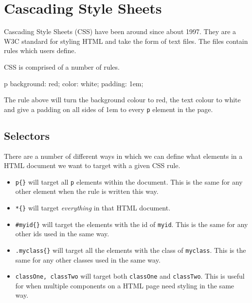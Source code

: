 
\section*{Cascading Style Sheets}
Cascading Style Sheets (CSS) have been around since about 1997. They are a W3C standard for styling HTML and take the form of text files. The files contain rules which users define. 

CSS is comprised of a number of rules.
\begin{css}
p{
    background: red;
    color: white;
    padding: 1em;
}
\end{css}
The rule above will turn the background colour to red, the text colour to white and give a padding on all sides of 1em to every \verb|p| element in the page.

\subsection*{Selectors}
There are a number of different ways in which we can define what elements in a HTML document we want to target with a given CSS rule.
\begin{itemize}
    \item \verb|p{}| will target all \verb|p| elements within the document. This is the same for any other element when the rule is written this way.
    \item \verb|*{}| will target \textit{everything} in that HTML document.
    \item \verb|#myid{}| will target the elements with the id of \verb|myid|. This is the same for any other ids used in the same way.
    \item \verb|.myclass{}| will target all the elements with the class of \verb|myclass|. This is the same for any other classes used in the same way. 
    \item \verb|classOne, classTwo| will target both \verb|classOne| and \verb|classTwo|. This is useful for when multiple components on a HTML page need styling in the same way.
\end{itemize}
